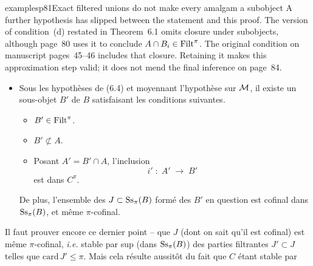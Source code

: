 \begin{dcomment}{examples}{p81}{Exact filtered unions do not make every amalgam a subobject}
A further hypothesis has slipped between the statement and this proof. The version of condition~(d) restated in Theorem~6.1 omits closure under subobjects, although page~80 uses it to conclude $A\cap B_i\in\mathrm{Filt}^\pi$. The original condition on manuscript pages~45--46 includes that closure. Retaining it makes this approximation step valid; it does not mend the final inference on page~84.
\end{dcomment}


\begin{itemize}
\item[($*$)] Sous les hypothèses de (6.4) et moyennant l'hypothèse  sur $\mathcal{M}$, il existe un sous-objet $B'$ de $B$ satisfaisant les conditions suivantes.
\begin{itemize}
\item[\textit{a})] $B' \in \mathrm{Filt}^{\pi}$.
\item[\textit{b})] $B' \not\subset A$.
\item[\textit{c})] Posant $A' = B' \cap A$, l'inclusion
\[
i' \;:\; A' \;\longrightarrow\; B'
\]
est dans $C^{\pi}$.
\end{itemize}


De plus, l'ensemble des $J \subset \mathrm{Ss}_{\pi}(B)$ formé des $B'$ en question est cofinal dans $\mathrm{Ss}_{\pi}(B)$, et même $\pi$-cofinal.
\end{itemize}

Il faut prouver encore ce dernier point -- que $J$ (dont on sait qu'il est cofinal) est même $\pi$-cofinal, \textit{i.e.} stable par sup (dans $\mathrm{Ss}_{\pi}(B)$) des parties filtrantes $J' \subset J$ telles que $\mathrm{card}\, J' \leq \pi$. Mais cela résulte aussitôt du fait que $C$ étant stable par

